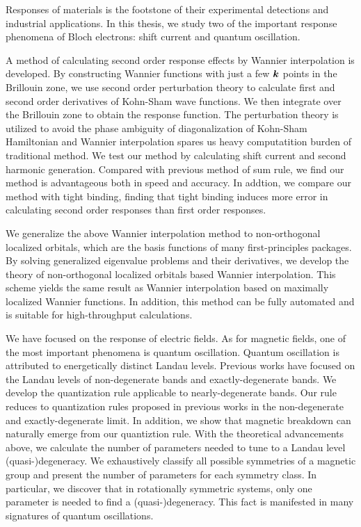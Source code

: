 \begin{eabstract}
  Responses of materials is the footstone of their experimental detections and industrial applications. In this thesis, we study two of the important response phenomena of Bloch electrons: shift current and quantum oscillation.

  A method of calculating second order response effects by Wannier interpolation is developed. By constructing Wannier functions with just a few $\boldsymbol{k}$ points in the Brillouin zone, we use second order perturbation theory to calculate first and second order derivatives of Kohn-Sham wave functions. We then integrate over the Brillouin zone to obtain the response function. The perturbation theory is utilized to avoid the phase ambiguity of diagonalization of Kohn-Sham Hamiltonian and Wannier interpolation spares us heavy computatition burden of traditional method. We test our method by calculating shift current and second harmonic generation. Compared with previous method of sum rule, we find our method is advantageous both in speed and accuracy. In addtion, we compare our method with tight binding, finding that tight binding induces more error in calculating second order responses than first order responses.

  We generalize the above Wannier interpolation method to non-orthogonal localized orbitals, which are the basis functions of many first-principles packages. By solving generalized eigenvalue problems and their derivatives, we develop the theory of non-orthogonal localized orbitals based Wannier interpolation. This scheme yields the same result as Wannier interpolation based on maximally localized Wannier functions. In addition, this method can be fully automated and is suitable for high-throughput calculations.

  We have focused on the response of electric fields. As for magnetic fields, one of the most important phenomena is quantum oscillation. Quantum oscillation is attributed to energetically distinct Landau levels. Previous works have focused on the Landau levels of non-degenerate bands and exactly-degenerate bands. We develop the quantization rule applicable to nearly-degenerate bands. Our rule reduces to quantization rules proposed in previous works in the non-degenerate and exactly-degenerate limit. In addition, we show that magnetic breakdown can naturally emerge from our quantiztion rule. With the theoretical advancements above, we calculate the number of parameters needed to tune to a Landau level (quasi-)degeneracy. We exhaustively classify all possible symmetries of a magnetic group and present the number of parameters for each symmetry class. In particular, we discover that in rotationally symmetric systems, only one parameter is needed to find a (quasi-)degeneracy. This fact is manifested in many signatures of quantum oscillations.
\end{eabstract}
